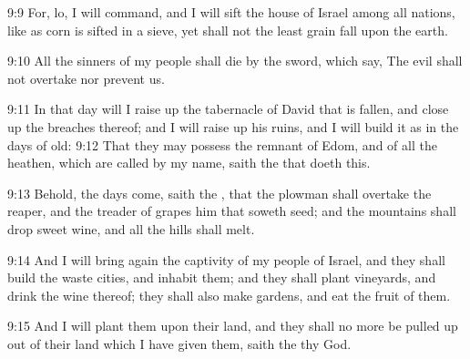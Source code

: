 9:9 For, lo, I will command, and I will sift the house of Israel among all nations, like as corn is sifted in a sieve, yet shall not the least grain fall upon the earth.

9:10 All the sinners of my people shall die by the sword, which say, The evil shall not overtake nor prevent us.

9:11 In that day will I raise up the tabernacle of David that is fallen, and close up the breaches thereof; and I will raise up his ruins, and I will build it as in the days of old: 9:12 That they may possess the remnant of Edom, and of all the heathen, which are called by my name, saith the \LORD that doeth this.

9:13 Behold, the days come, saith the \LORD, that the plowman shall overtake the reaper, and the treader of grapes him that soweth seed; and the mountains shall drop sweet wine, and all the hills shall melt.

9:14 And I will bring again the captivity of my people of Israel, and they shall build the waste cities, and inhabit them; and they shall plant vineyards, and drink the wine thereof; they shall also make gardens, and eat the fruit of them.

9:15 And I will plant them upon their land, and they shall no more be pulled up out of their land which I have given them, saith the \LORD thy God.

